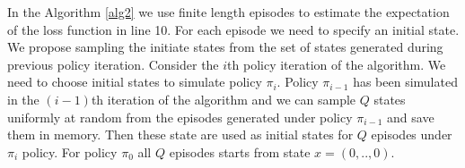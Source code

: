 \documentclass[11pt]{article}
\theoremstyle{definition}
\numberwithin{equation}{section}
\begin{document}
In the Algorithm \ref{alg2} we use  finite length episodes to estimate the expectation of the loss function in line 10. For each episode we need  to specify an initial state.
 We propose sampling the initiate states from the set of states generated during previous policy iteration.
  Consider the $i$th policy iteration of the algorithm. We need to choose initial states to simulate policy $\pi_i$.  Policy $\pi_{i-1}$ has been simulated in the $(i-1)$th iteration of the algorithm and we can    sample $Q$ states uniformly at random from the episodes generated under policy $\pi_{i-1}$ and  save them in memory. Then these state are used as initial states for   $Q$ episodes under $\pi_i$ policy. For policy $\pi_0$ all $Q$ episodes starts from state $x = (0,..,0).$
\end{document}
